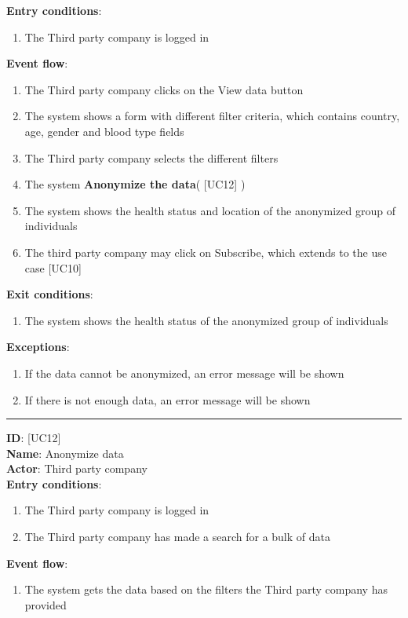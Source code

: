 \documentclass[12pt]{article}
\newcommand\usecase[1]{ [UC#1] }
\begin{document}
\begin{itemize}
    \textbf{Entry conditions}:
    		\begin{enumerate}
    			\item{The Third party company is logged in}
  		\end{enumerate}
  	\textbf{Event flow}:
  		\begin{enumerate}
    			\item{The Third party company clicks on the View data button}
    			\item{The system shows a form with different filter criteria, which contains country, age, gender and blood type fields}
    			\item{The Third party company selects the different filters}
    			\item{The system \textbf{Anonymize the data}(\usecase{12})}
    			\item{The system shows the health status and location of the anonymized group of individuals}
    			\item{The third party company may click on Subscribe, which extends to the use case \usecase{10}}
  		\end{enumerate}
  	\textbf{Exit conditions}:
  		\begin{enumerate}
    			\item{The system shows the health status of the anonymized group of individuals}
  		\end{enumerate}
  	\textbf{Exceptions}: 
  		\begin{enumerate}
    			\item{If the data cannot be anonymized, an error message will be shown}
    			\item{If there is not enough data, an error message will be shown}
  		\end{enumerate}
  	\rule{\linewidth}{0.4pt}	
  	\textbf{ID}: \usecase{12} \\
  	\textbf{Name}: Anonymize data \\
    \textbf{Actor}: Third party company \\
    \textbf{Entry conditions}:
    		\begin{enumerate}
    			\item{The Third party company is logged in}
    			\item{The Third party company has made a search for a bulk of data}
  		\end{enumerate}
  	\textbf{Event flow}:
  		\begin{enumerate}
    			\item{The system gets the data based on the filters the Third party company has provided}

\end{enumerate}
\end{itemize}
\end{document}
